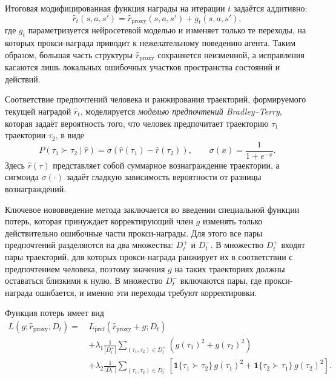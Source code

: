 Итоговая модифицированная функция награды на итерации $t$ задаётся аддитивно:
\begin{equation}
    \hat r_t(s,a,s') = \hat r_{\text{proxy}}(s,a,s') + g_t(s,a,s'),
\end{equation}
где $g_t$ параметризуется нейросетевой моделью и изменяет только те переходы, 
на которых прокси-награда приводит к нежелательному поведению агента. 
Таким образом, большая часть структуры $\hat r_{\text{proxy}}$ сохраняется 
неизменной, а исправления касаются лишь локальных ошибочных участков 
пространства состояний и действий.

Соответствие предпочтений человека и ранжирования траекторий, формируемого 
текущей наградой $\hat r_t$, моделируется \emph{моделью предпочтений Bradley--Terry}, 
которая задаёт вероятность того, что человек предпочитает траекторию 
$\tau_1$ траектории $\tau_2$, в виде
\begin{equation}
    P(\tau_1 \succ \tau_2 \mid \hat r) = 
    \sigma\!\left( 
        \hat r(\tau_1) - \hat r(\tau_2)
    \right),
    \qquad 
    \sigma(x) = \frac{1}{1 + e^{-x}}.
\end{equation}
Здесь $\hat r(\tau)$ представляет собой суммарное вознаграждение траектории, 
а сигмоида $\sigma(\cdot)$ задаёт гладкую зависимость вероятности от разницы 
вознаграждений.

Ключевое нововведение метода заключается во введении специальной функции потерь, 
которая принуждает корректирующий член $g$ изменять только действительно 
ошибочные части прокси-награды. Для этого все пары предпочтений разделяются 
на два множества: $D_t^+$ и $D_t^-$. В множество $D_t^+$ входят пары траекторий, 
для которых прокси-награда ранжирует их в соответствии с предпочтением человека, 
поэтому значения $g$ на таких траекториях должны оставаться близкими к нулю. 
В множество $D_t^-$ включаются пары, где прокси-награда ошибается, 
и именно эти переходы требуют корректировки. 

Функция потерь имеет вид
\begin{equation}
\begin{aligned}
L(g; \hat r_{\text{proxy}}, D_t) 
 =\,& L_{\text{pref}}(\hat r_{\text{proxy}} + g; D_t) \\
 &+ \lambda_1 \frac{1}{|D_t^+|}
     \sum_{(\tau_1, \tau_2) \in D_t^+}
     \left(g(\tau_1)^2 + g(\tau_2)^2\right) \\
 &+ \lambda_2 \frac{1}{|D_t^-|}
     \sum_{(\tau_1, \tau_2) \in D_t^-}
        \left[
            \mathbf{1}\{\tau_1 \succ \tau_2\} \, g(\tau_1)^2
            +
            \mathbf{1}\{\tau_2 \succ \tau_1\} \, g(\tau_2)^2
        \right].
\end{aligned}
\end{equation}

